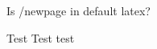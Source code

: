 \documentclass[12pt, letterpaper]{article}
\begin{document}



      


      
      







Is /newpage in default latex?

\newpage

Test Test test
\end{document}
